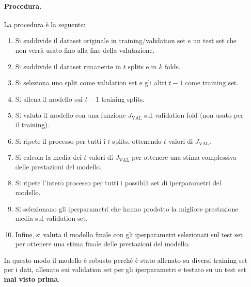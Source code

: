 \paragraph{Procedura.}
La procedura è la seguente:
\begin{enumerate}
	\item Si suddivide il dataset originale in training/validation set e un test set che non verrà usato fino alla fine della valutazione.
	\item Si suddivide il dataset rimanente in $t$ splits e in $k$ folds.
	\item Si seleziona uno split come validation set e gli altri $t-1$ come training set.
	\item Si allena il modello sui $t-1$ training splits.
	\item Si valuta il modello con una funzione $J_{\text{VAL}}$ sul validation fold (non usato per il training).
	\item Si ripete il processo per tutti i $t$ splits, ottenendo $t$ valori di $J_{\text{VAL}}$.
	\item Si calcola la media dei $t$ valori di $J_{\text{VAL}}$ per ottenere una stima complessiva delle prestazioni del modello.
	\item Si ripete l'intero processo per tutti i possibili set di iperparametri del modello.
	\item Si selezionano gli iperparametri che hanno prodotto la migliore prestazione media sul validation set.
	\item Infine, si valuta il modello finale con gli iperparametri selezionati sul test set per ottenere una stima finale delle prestazioni del modello.
\end{enumerate}

In questo modo il modello è robusto perché è stato allenato su diversi training set per i dati, allenato sui validation set per gli iperparametri e testato su un test set \textbf{mai visto prima}.


